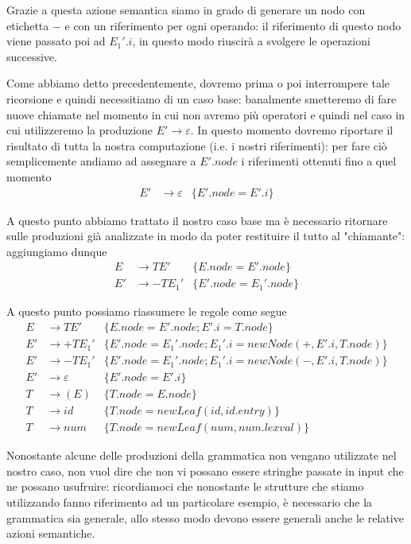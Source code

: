 \documentclass[class=book, crop=false, oneside, 12pt]{standalone}
\begin{document}
Grazie a questa azione semantica siamo in grado di generare un nodo con etichetta \(-\) e con un riferimento per ogni operando: il riferimento di questo nodo viene passato poi ad \(E_1'.i\), in questo modo riuscirà a svolgere le operazioni successive. 

Come abbiamo detto precedentemente, dovremo prima o poi interrompere tale ricorsione e quindi necessitiamo di un caso base: banalmente smetteremo di fare nuove chiamate nel momento in cui non avremo più operatori e quindi nel caso in cui utilizzeremo la produzione \(E' \to \varepsilon\). In questo momento dovremo riportare il risultato di tutta la nostra computazione (i.e. i nostri riferimenti): per fare ciò semplicemente andiamo ad assegnare a \(E'.node\) i riferimenti ottenuti fino a quel momento
\begin{align*}
     E' &\to \varepsilon &\{E'.node = E'.i\}
\end{align*}

A questo punto abbiamo trattato il nostro caso base ma è necessario ritornare sulle produzioni già analizzate in modo da poter restituire il tutto al "chiamante": aggiungiamo dunque   
\begin{align*}
    E &\to TE' &\{E.node = E'.node\} \\
    E' &\to -TE_{1}' &\{E'.node = E_{1}'.node\}
\end{align*}

A questo punto possiamo riassumere le regole come segue
\begin{align*}
    E &\to TE' &\{E.node = E'.node; E'.i = T.node\} \\
    E' &\to +TE_{1}' &\{E'.node = E_{1}'.node; E_{1}'.i = newNode(+, E'.i, T.node)\} \\
    E' &\to -TE_{1}' &\{E'.node = E_{1}'.node; E_{1}'.i = newNode(-, E'.i, T.node)\} \\
    E' &\to \varepsilon &\{E'.node = E'.i\} \\
    T &\to (E) &\{T.node = E.node\} \\
    T &\to id &\{T.node = newLeaf(id, id.entry)\} \\
    T &\to num &\{T.node = newLeaf(num, num.lexval)\}
\end{align*}

Nonostante alcune delle produzioni della grammatica non vengano utilizzate nel nostro caso, non vuol dire che non vi possano essere stringhe passate in input che ne possano usufruire: ricordiamoci che nonostante le strutture che stiamo utilizzando fanno riferimento ad un particolare esempio, è necessario che la grammatica sia generale, allo stesso modo devono essere generali anche le relative azioni semantiche.
\end{document}
